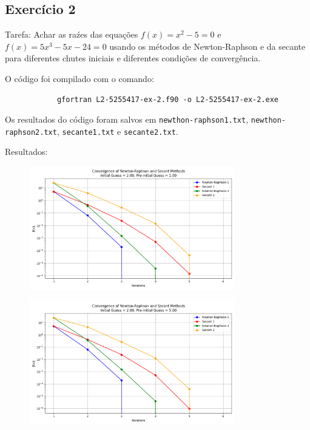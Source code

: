 \documentclass[12pt, a4paper]{article} %
\begin{document}
    \subsection{Exerc\'icio 2}

        Tarefa: Achar as ra\'zes das equa\c{c}\~oes $f(x) = x^2 - 5 = 0$ e $f(x) = 5x^3 - 5x - 24 = 0$ usando os m\'etodos de Newton-Raphson e da secante para diferentes chutes iniciais e diferentes condi\c{c}\~oes de converg\^encia.


        O c\'odigo foi compilado com o comando:
        \begin{verbatim}
            gfortran L2-5255417-ex-2.f90 -o L2-5255417-ex-2.exe
        \end{verbatim}

        Os resultados do c\'odigo foram salvos em \texttt{newthon-raphson1.txt}, \texttt{newthon-raphson2.txt}, \texttt{secante1.txt} e \texttt{secante2.txt}.

        Resultados:

        \begin{figure}[H]
            \centering
            \includegraphics[width=0.8\textwidth]{../images/convergence-initial-20-preinitial-10.png}
            \caption{}
        \end{figure}

        \begin{figure}[H]
            \centering
            \includegraphics[width=0.8\textwidth]{../images/convergence-initial-20-preinitial-50.png}
            \caption{}
        \end{figure}
        
\end{document}
